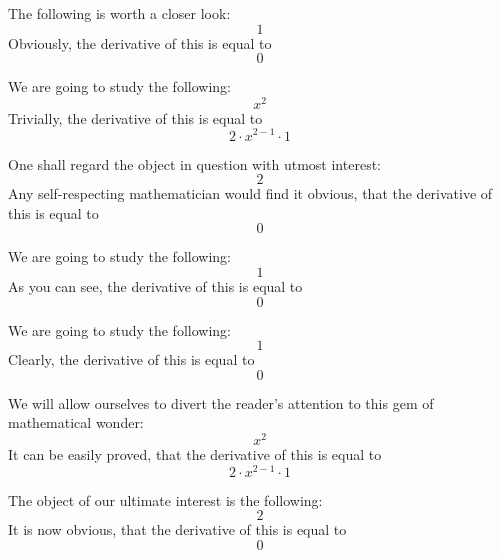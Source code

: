 \documentclass{article}
\begin{document}
The following is worth a closer look:
\begin{equation}
1 
\end{equation}
Obviously, the derivative of this is equal to
\begin{equation}
0 
\end{equation}

We are going to study the following:
\begin{equation}
x ^{2 } 
\end{equation}
Trivially, the derivative of this is equal to
\begin{equation}
2 \cdot x ^{2 - 1 } \cdot 1 
\end{equation}

One shall regard the object in question with utmost interest:
\begin{equation}
2 
\end{equation}
Any self-respecting mathematician would find it obvious, that the derivative of this is equal to
\begin{equation}
0 
\end{equation}

We are going to study the following:
\begin{equation}
1 
\end{equation}
As you can see, the derivative of this is equal to
\begin{equation}
0 
\end{equation}

We are going to study the following:
\begin{equation}
1 
\end{equation}
Clearly, the derivative of this is equal to
\begin{equation}
0 
\end{equation}

We will allow ourselves to divert the reader's attention to this gem of mathematical wonder:
\begin{equation}
x ^{2 } 
\end{equation}
It can be easily proved, that the derivative of this is equal to
\begin{equation}
2 \cdot x ^{2 - 1 } \cdot 1 
\end{equation}

The object of our ultimate interest is the following:
\begin{equation}
2 
\end{equation}
It is now obvious, that the derivative of this is equal to
\begin{equation}
0 
\end{equation}
\end{document}
